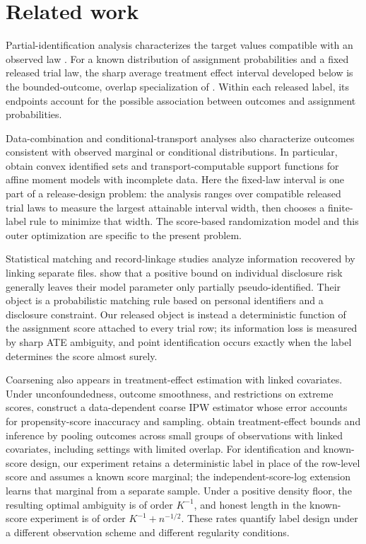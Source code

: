 \section{Related work}

Partial-identification analysis characterizes the target values compatible with an observed law \citep{Manski1990,HorowitzManski1995,Tamer2010}. For a known distribution of assignment probabilities and a fixed released trial law, the sharp average treatment effect interval developed below is the bounded-outcome, overlap specialization of \citet[Theorem 3.2 and eq. (3.1)]{FanShermanShum2014}. Within each released label, its endpoints account for the possible association between outcomes and assignment probabilities.

Data-combination and conditional-transport analyses also characterize outcomes consistent with observed marginal or conditional distributions. In particular, \citet[Section 3]{FanParkPassShi2025} obtain convex identified sets and transport-computable support functions for affine moment models with incomplete data. Here the fixed-law interval is one part of a release-design problem: the analysis ranges over compatible released trial laws to measure the largest attainable interval width, then chooses a finite-label rule to minimize that width. The score-based randomization model and this outer optimization are specific to the present problem.

Statistical matching and record-linkage studies analyze information recovered by linking separate files.  show that a positive bound on individual disclosure risk generally leaves their model parameter only partially pseudo-identified. Their object is a probabilistic matching rule based on personal identifiers and a disclosure constraint. Our released object is instead a deterministic function of the assignment score attached to every trial row; its information loss is measured by sharp ATE ambiguity, and point identification occurs exactly when the label determines the score almost surely.

Coarsening also appears in treatment-effect estimation with linked covariates. Under unconfoundedness, outcome smoothness, and restrictions on extreme scores, \citet[Assumptions 1--3 and Informal Theorem 1.1]{KalavasisMehrotraZampetakis2024} construct a data-dependent coarse IPW estimator whose error accounts for propensity-score inaccuracy and sampling.  obtain treatment-effect bounds and inference by pooling outcomes across small groups of observations with linked covariates, including settings with limited overlap. For identification and known-score design, our experiment retains a deterministic label in place of the row-level score and assumes a known score marginal; the independent-score-log extension learns that marginal from a separate sample. Under a positive density floor, the resulting optimal ambiguity is of order \(K^{-1}\), and honest length in the known-score experiment is of order \(K^{-1}+n^{-1/2}\). These rates quantify label design under a different observation scheme and different regularity conditions.

